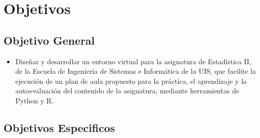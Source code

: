 \documentclass[letter,oneside,12pt,spanish]{report}
\begin{document}

\newpage





\newpage


\chapter{Objetivos}

\section{Objetivo General}

\begin{itemize}
    \item Diseñar y desarrollar un entorno virtual para la asignatura de Estadística II, de la Escuela de Ingeniería de Sistemas e 
    Informática de la UIS, que facilite la ejecución de un plan de aula propuesto para la práctica, el aprendizaje y la autoevaluación 
    del contenido de la asignatura, mediante herramientas de Python y R.
\end{itemize}

\section{Objetivos Especificos}
\end{document}
